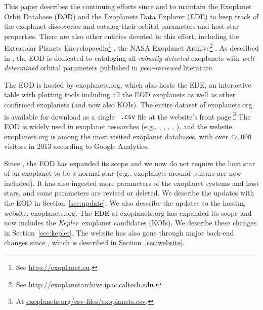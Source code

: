 \documentclass[11pt,preprint]{aastex}
\def\kepler{\textit{Kepler}}
\begin{document}
\begin{CJK*}{UTF8}{gbsn}
This paper describes the continuing efforts since \cite{Butler2006}
and \cite{Wright2011} to maintain the Exoplanet Orbit Database (EOD)
and the Exoplanets Data Explorer (EDE) to keep track of the exoplanet
discoveries and catalog their orbital parameters and host star
properties. There are also other entities devoted to this effort,
including the Extrasolar Planets Encyclopaedia\footnote{See
  \url{http://exoplanet.eu}.}  \citep{Schneider2011}, the NASA
Exoplanet Archive\footnote{See
  \url{http://exoplanetarchive.ipac.caltech.edu}.}
\citep{Akeson2013}. As described in \cite{Wright2011}, the EOD is
dedicated to cataloging all \emph{robustly-detected} exoplanets with
\emph{well-determined} orbital parameters published in
\emph{peer-reviewed} literature.

The EOD is hosted by exoplanets.org, which also hosts the EDE, an
interactive table with plotting tools including all the EOD exoplanets
as well as other confirmed exoplanets (and now also KOIs). The entire
dataset of exoplanets.org is available for download as a single {\tt
  .csv} file at the website's front page.\footnote{At
  \url{exoplanets.org/csv-files/exoplanets.csv}.} The EOD is widely
used in exoplanet researches (e.g., \citealt{Dawson2013},
\citealt{Howard2013}, \citealt{Kipping2013}, \citealt{Kane2014},
\citealt{Weiss2014}), and the website exoplanets.org is among the most
visited exoplanet databases, with over $47,000$ visitors in 2013
according to Google Analytics.

Since \cite{Wright2011}, the EOD has expanded its scope and we now do
not require the host star of an exoplanet to be a normal star (e.g.,
exoplanets around pulsars are now included). It has also ingested more
parameters of the exoplanet systems and host stars, and some
parameters are revised or deleted. We describe the updates with the
EOD in Section~\ref{sec:update}. We also describe the updates to the
hosting website, exoplanets.org. The EDE at exoplanets.org has
expanded its scope and now includes the \kepler\ exoplanet candidates
(KOIs). We describe these changes in Section~\ref{sec:kepler}. The
website has also gone through major back-end changes since
\cite{Wright2011}, which is described in Section~\ref{sec:website}.

\begin{comment}
Since the first peer-reviewed list of exoplanets with robust orbits
\citep{Butler2002,Butler2006}, the count of exoplanets has increased
from less than 200 to over 1490 as of March 2014
(exoplanets.org). Before the launch of NASA's \kepler\ mission
\citep{Borucki2010}, most confirmed exoplanets were discovered via the
precise radial velocity (RV) method. However, since 2009, \kepler\ has
contributed over $\sim$ 800 confirmed exoplanets (e.g.,
\ciatealt{Marcy2014}, \citealt{Rowe2014}) as well as over 3000
exoplanet candidates (\kepler\ Objects of Interest, KOIs;
e.g.~\citealt{Batalha2013}).


\end{comment}
\end{CJK*}
\end{document}

